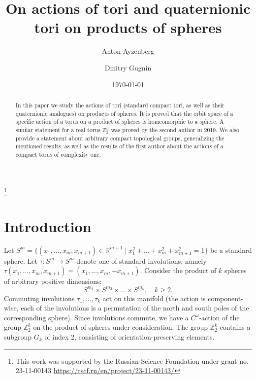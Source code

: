 \documentclass[english, 12pt]{amsproc}
\numberwithin{equation}{section}
\theoremstyle{plain}
\theoremstyle{definition}
\theoremstyle{remark}
\newcommand{\Zo}{\mathbb{Z}}
\newcommand{\Ro}{\mathbb{R}}
\newcommand{\Zt}{\Zo_2}
\begin{document}
\title[On actions of tori and quaternionic tori]{On actions of tori and quaternionic tori on products of spheres}

\author[A.\,A.\,Ayzenberg]{Anton Ayzenberg}
\address{Neapolis University, Pafos, Cyprus}
\author[D.\,V.\,Gugnin]{Dmitry Gugnin}
\address{Steklov Mathematical Institute, Moscow, Russia}

\date{\today}




\thanks{This work was supported by the Russian Science Foundation under grant no. 23-11-00143 \href{https://rscf.ru/en/project/23-11-00143/}{https://rscf.ru/en/project/23-11-00143/}
}

\begin{abstract}
In this paper we study the actions of tori (standard compact tori, as well as their quaternionic analogues) on products of spheres. It is proved that the orbit space of a specific action of a torus on a product of spheres is homeomorphic to a sphere. A similar statement for a real torus $\mathbb{Z}_2^n$ was proved by the second author in 2019. We also provide a statement about arbitrary compact topological groups, generalizing the mentioned results, as well as the results of the first author about the actions of a compact torus of complexity one.
\end{abstract}

\maketitle

\section{Introduction}\label{secIntro}

Let $S^m = \{(x_1,\ldots, x_m,x_{m+1})\in \Ro^{m+1} \mid x_1^2+\ldots+ x_m^2 + x_{m+1}^2 = 1\}$ be a standard sphere. Let $\tau\colon S^m \to S^m$ denote one of standard involutions, namely $\tau(x_1,\ldots,x_m,x_{m+1}) = (x_1,\ldots,x_m, - x_{m+1})$. Consider the product of $k$ spheres of arbitrary positive dimensions:
\[
S^{m_1}\times S^{m_2}\times \ldots \times S^{m_k}, \quad k\geqslant 2.
\]
Commuting involutions $\tau_1, \ldots, \tau_k$ act on this manifold (the action is component-wise, each of the involutions is a permutation of the north and south poles of the corresponding sphere). Since involutions commute, we have a $C^{\omega}$-action of the group $\Zt^{k}$ on the product of spheres under consideration. The group $\Zt^{k}$ contains a subgroup $G_k$ of index 2, consisting of orientation-preserving elements.
\end{document}
